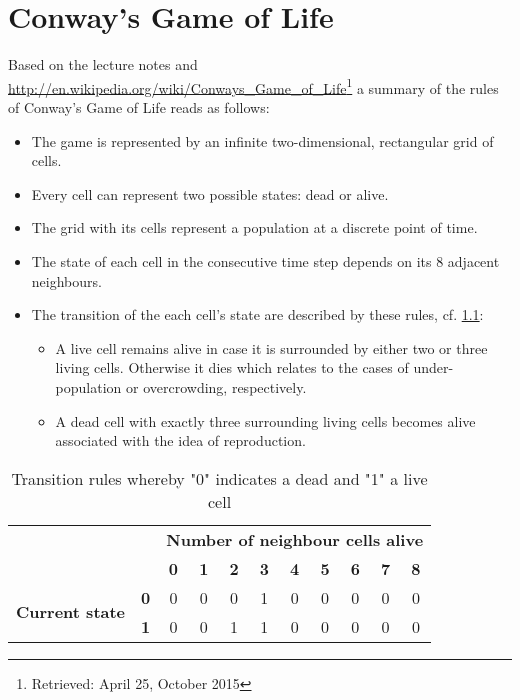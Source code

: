 \chapter{Conway's Game of Life}

Based on the lecture notes and \url{http://en.wikipedia.org/wiki/Conways_Game_of_Life}\footnote{Retrieved: April 25, October 2015} a summary of the rules of Conway's Game of Life reads as follows:
\begin{itemize}
	\item The game is represented by an infinite two-dimensional, rectangular grid of cells.
	\item Every cell can represent two possible states: dead or alive.
	\item The grid with its cells represent a population at a discrete point of time.
	\item The state of each cell in the consecutive time step depends on its 8 adjacent neighbours.
	\item The transition of the each cell's state are described by these rules, cf. \cref{table:rules}:
	\begin{itemize}
		\item A live cell remains alive in case it is surrounded by either two or three living cells. Otherwise it dies which relates to the cases of under-population or overcrowding, respectively.
		\item A dead cell with exactly three surrounding living cells becomes alive associated with the idea of reproduction.
	\end{itemize}
\end{itemize}

\begin{table}[h]\centering
	\begin{tabular}{c c | c c c c c c c c c} \hline\hline
		& & \multicolumn{9}{c}{\bf Number of neighbour cells alive} \\
		& & \bf 0 & \bf 1 & \bf 2 & \bf 3 & \bf 4 & \bf 5 & \bf 6 & \bf 7 & \bf 8 \\ \hline
		\multirow{2}{*}{\bf Current state} & \bf 0 & 0 & 0 & 0 & 1 & 0 & 0 & 0 & 0 & 0 \\
		& \bf 1 & 0 & 0 & 1 & 1 & 0 & 0 & 0 & 0 & 0 \\
		\hline\hline
	\end{tabular}
	\caption[Transition rules]{Transition rules whereby "0" indicates a dead and "1" a live cell}
	\label{table:rules}
\end{table}


